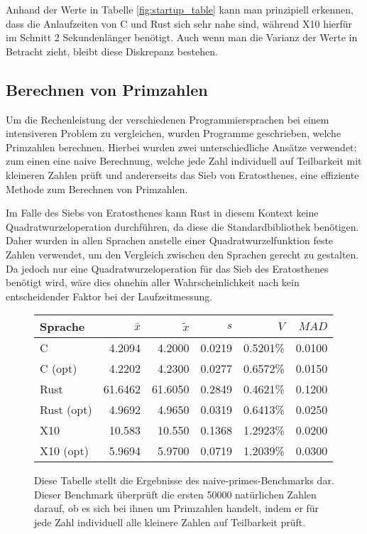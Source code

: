 Anhand der Werte in Tabelle \ref{fig:startup_table} kann man prinzipiell erkennen,
dass die Anlaufzeiten von C und Rust sich sehr nahe sind, während X10 hierfür im Schnitt 2 Sekundenlänger benötigt.
Auch wenn man die Varianz der Werte in Betracht zieht, bleibt diese Diskrepanz bestehen.


\subsection{Berechnen von Primzahlen}\label{sec:primes_calc}

Um die Rechenleistung der verschiedenen Programmiersprachen bei einem intensiveren Problem zu vergleichen, wurden
Programme geschrieben, welche Primzahlen berechnen. Hierbei wurden zwei unterschiedliche Ansätze verwendet: zum einen
eine naive Berechnung, welche jede Zahl individuell auf Teilbarkeit mit kleineren Zahlen prüft und andererseits
das Sieb von Eratosthenes, eine effiziente Methode zum Berechnen von Primzahlen.

Im Falle des Siebs von Eratosthenes kann Rust in diesem Kontext keine Quadratwurzeloperation durchführen,
da diese die Standardbibliothek benötigen. Daher wurden in allen Sprachen anstelle einer Quadratwurzelfunktion
feste Zahlen verwendet, um den Vergleich zwischen den Sprachen gerecht zu gestalten.
Da jedoch nur eine Quadratwurzeloperation für das Sieb des Eratosthenes
benötigt wird, wäre dies ohnehin aller Wahrscheinlichkeit nach kein entscheidender Faktor bei der Laufzeitmessung.


\begin{figure}[hb]
	\begin{center}
		\begin{tabular}{lrrrrr}
			\toprule
			Sprache    & $\bar{x}$ & $\tilde{x}$ & $s$ & $V$ & $MAD$ \\
			\midrule
			C          & 4.2094  & 4.2000  & 0.0219 & 0.5201\% & 0.0100 \\
			C (opt)    & 4.2202  & 4.2300  & 0.0277 & 0.6572\% & 0.0150 \\
			Rust       & 61.6462 & 61.6050 & 0.2849 & 0.4621\% & 0.1200 \\
			Rust (opt) & 4.9692  & 4.9650  & 0.0319 & 0.6413\% & 0.0250 \\
			X10        & 10.583  & 10.550  & 0.1368 & 1.2923\% & 0.0200 \\
			X10 (opt)  & 5.9694  & 5.9700  & 0.0719 & 1.2039\% & 0.0300 \\
			\bottomrule
		\end{tabular}
	\end{center}
	\caption{
		Diese Tabelle stellt die Ergebnisse des naive-primes-Benchmarks dar.
		Dieser Benchmark überprüft die ersten 50000 natürlichen Zahlen darauf,
		ob es sich bei ihnen um Primzahlen handelt,
		indem er für jede Zahl individuell alle kleinere Zahlen auf Teilbarkeit prüft.
	}
	\label{fig:primes_naive_table}
\end{figure}


